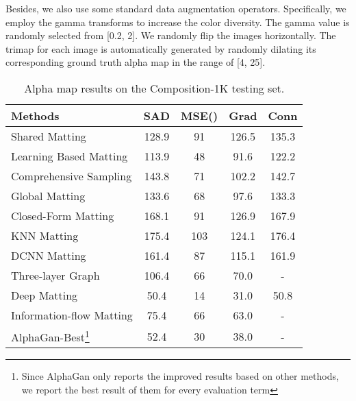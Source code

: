 \documentclass[10pt,twocolumn,letterpaper]{article}
\begin{document}
Besides, we also use some standard data augmentation operators. Specifically, we employ the gamma transforms to increase the color diversity. The gamma value is randomly selected from [0.2, 2]. We randomly flip the images horizontally. The trimap for each image is automatically generated by randomly dilating its corresponding ground truth alpha map in the range of [4, 25]. 







\begin{table}[t]
	\centering
	\caption{Alpha map results on the Composition-1K testing set.}
	\footnotesize
	\label{table:rst-com1k-matte}
\begin{tabular}{lcccc}
			\hline
			\multicolumn{1}{m{35mm}}{Methods} & SAD & MSE() & Grad & Conn \\ 
			\hline
			\multicolumn{1}{m{35mm}}{Shared Matting\cite{gastal2010shared}}  & 128.9 & 91 & 126.5 & 135.3 \\
			\multicolumn{1}{m{35mm}}{Learning Based Matting \cite{zheng2009learning}} & 113.9 & 48 & 91.6 & 122.2 \\
			\multicolumn{1}{m{35mm}}{Comprehensive Sampling \cite{shahrian2013improving}} & 143.8 & 71 &102.2 & 142.7 \\
			\multicolumn{1}{m{35mm}}{Global Matting \cite{he2011global}} & 133.6 & 68 & 97.6 & 133.3 \\
			\multicolumn{1}{m{35mm}}{Closed-Form Matting \cite{levin2008closed}} & 168.1 & 91 & 126.9 & 167.9 \\
			\multicolumn{1}{m{35mm}}{KNN Matting \cite{chen2013knn} } & 175.4 & 103 & 124.1 & 176.4 \\
			\multicolumn{1}{m{35mm}}{DCNN Matting \cite{cho2016natural}} & 161.4 & 87 & 115.1 & 161.9 \\
			\multicolumn{1}{m{35mm}}{Three-layer Graph \cite{li2017three}} & 106.4 & 66 & 70.0 & - \\    
			\multicolumn{1}{m{35mm}}{Deep Matting \cite{xu2017deep}} & 50.4 & 14 & 31.0 & 50.8 \\
			\multicolumn{1}{m{35mm}}{Information-flow Matting \cite{aksoy2017designing}} & 75.4 &  66 & 63.0 & - \\
			\multicolumn{1}{m{35mm}}{AlphaGan-Best\footnote{Since AlphaGan only reports the improved results based on other methods, we report the best result of them for every evaluation term} \cite{lutz2018alphagan} }  & 52.4 & 30 & 38.0 & -  \\ 
\hline

\end{tabular}
\end{table}
\end{document}
